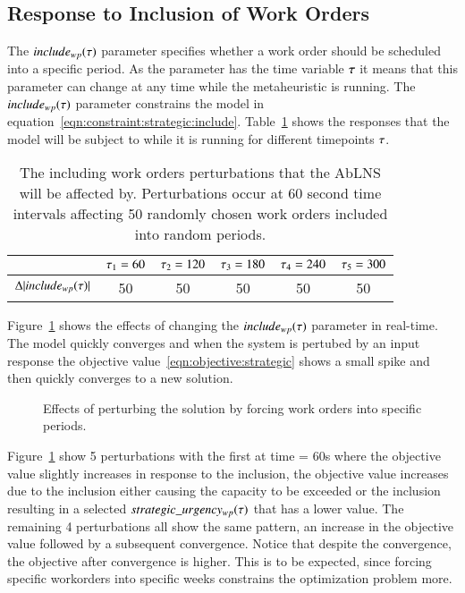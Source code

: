 \subsection{Response to Inclusion of Work Orders}\label{sec:response_work_orders}
The $include_{wp}(\tau)$ parameter specifies whether a work order
should be scheduled into a specific period. As the parameter has the time
variable $\tau$ it means that this parameter can change at any time
while the metaheuristic is running. The $include_{wp}(\tau)$ parameter
constrains the model in equation~\ref{eqn:constraint:strategic:include}.
Table~\ref{tab:responses:inclusion} shows the responses that the model will be
subject to while it is running for different timepoints $\tau$.

\begin{table}[H]
	\centering
	\begin{tabular}{cccccc}
	\toprule
	                                & $\tau_1 = 60$ & $\tau_2 = 120$ & $\tau_3 = 180$ & $\tau_4 = 240$ & $\tau_5 = 300$ \\ \midrule
	$\Delta |include_{wp}(\tau)|$ & 50                    & 50                     & 50                     & 50                     & 50                     \\ \bottomrule
	\end{tabular}
	\caption{The including work orders perturbations that the AbLNS will be affected by. 
		Perturbations occur at 60 second time intervals affecting 50 randomly chosen work orders included into random periods.
	}\label{tab:responses:inclusion}
\end{table}

Figure~\ref{fig:responses:inclusion} shows the effects of changing the $
include_{wp}(\tau)$ parameter in real-time. The model quickly converges
and when the system is pertubed by an input response the objective 
value~\ref{eqn:objective:strategic} shows a small spike and then quickly converges to
a new solution.

\begin{figure}[H]
	\centering
	\resizebox{10cm}{!}{
		
	}
	\caption{Effects of perturbing the solution by forcing work orders into specific
		periods.
	}\label{fig:responses:inclusion}
\end{figure}
Figure~\ref{fig:responses:inclusion}  show 5 perturbations with the first
at time = 60s where the objective value  slightly increases in response to
the inclusion, the objective value increases due to the inclusion either
causing the capacity to be exceeded or the inclusion resulting in a selected
$ strategic\_urgency_{w p}(\tau)$ that has a lower value. The remaining 4 perturbations
all show the same  pattern, an increase in the objective value followed by
a subsequent convergence. Notice that despite the convergence, the objective
after convergence is higher. This is to be expected, since forcing specific
workorders into specific weeks constrains the optimization problem more.

